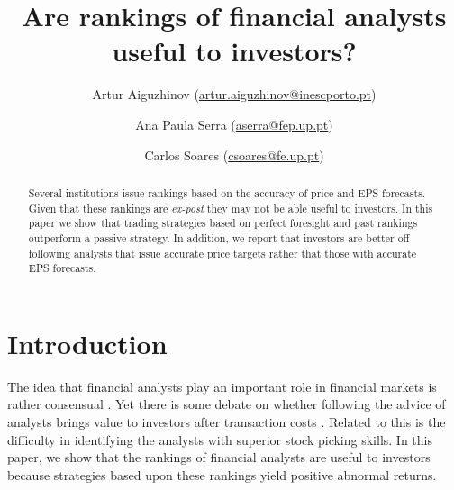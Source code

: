 \documentclass{article}\usepackage[]{graphicx}\usepackage[]{color}
\begin{document}
\title{Are rankings of financial analysts useful to investors?}
 \author[1,2]{ Artur Aiguzhinov (\href{mailto:artur.aiguzhinov@inescporto.pt}{artur.aiguzhinov@inescporto.pt})}
 \author[1]{ Ana Paula Serra (\href{mailto:aserra@fep.up.pt}{aserra@fep.up.pt})}
 \author[2,4]{Carlos Soares (\href{mailto:csoares@fe.up.pt}{csoares@fe.up.pt})}



\maketitle
\thispagestyle{fancy}

\begin{abstract}
Several institutions issue rankings based on the accuracy of price and EPS forecasts. Given that these rankings are \textit{ex-post} they may not be able useful to investors. In this paper  we show that trading strategies based on perfect foresight and past rankings outperform a passive strategy.  In addition, we report that investors are better off following analysts that issue  accurate price targets rather that those with accurate EPS forecasts. 
\end{abstract}

\section{Introduction}
\label{sec:intro}

The idea that financial analysts play an important role in financial markets is rather consensual \citep{cowles1933csm,obrien1990}. Yet there is some debate on whether following the advice of analysts brings value to investors after transaction costs \citep{womack1996,mikhail2004sae,li2005persistence}. Related to this is the difficulty in identifying the analysts with superior stock picking skills. In this paper, we show that the rankings of financial analysts are useful to investors because strategies based upon these rankings yield positive abnormal returns.
\end{document}
